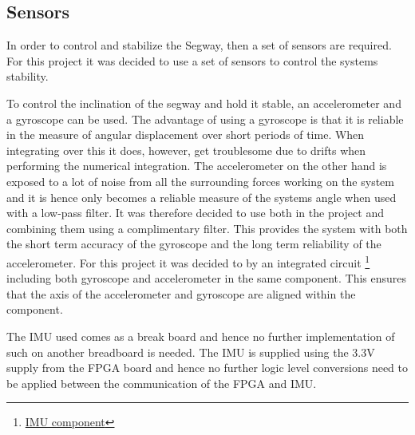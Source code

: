
\subsection{Sensors}
In order to control and stabilize the Segway, then a set of sensors are required.
For this project it was decided to use a set of sensors to control the systems stability.




To control the inclination of the segway and hold it stable, an accelerometer and a gyroscope can be used.
The advantage of using a gyroscope is that it is reliable in the measure of angular displacement over short periods of time.
When integrating over this it does, however, get troublesome due to drifts when performing the numerical integration.
The accelerometer on the other hand is exposed to a lot of noise from all the surrounding forces working on the system and it is hence only becomes a reliable measure of the systems angle when used with a low-pass filter.
It was therefore decided to use both in the project and combining them using a complimentary filter.
This provides the system with both the short term accuracy of the gyroscope and the long term reliability of the accelerometer.
For this project it was decided to by an integrated circuit
\footnote{ \href{https://www.sparkfun.com/products/13339}{IMU component}}
 including both gyroscope and accelerometer in the same component.
This ensures that the axis of the accelerometer and gyroscope are aligned within the component.

The IMU used comes as a break board and hence no further implementation of such on another breadboard is needed.
The IMU is supplied using the 3.3V supply from the FPGA board and hence no further logic level conversions need to be applied between the communication of the FPGA and IMU.



